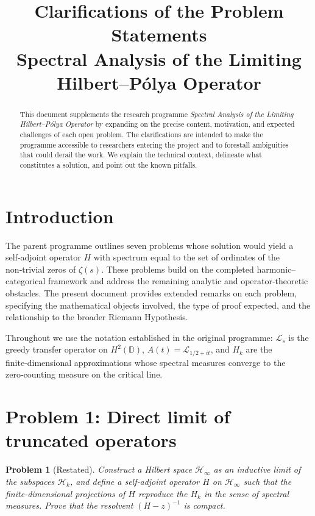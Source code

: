 \documentclass[11pt,a4paper]{article}
\title{\bfseries Clarifications of the Problem Statements\\
\large Spectral Analysis of the Limiting Hilbert--Pólya Operator}
\author{}
\date{}
\newtheorem{problem}{Problem}[section]
\theoremstyle{remark}
\newcommand{\cL}{\mathcal{L}}
\newcommand{\cH}{\mathcal{H}}
\begin{document}
\maketitle

\begin{abstract}
This document supplements the research programme \emph{Spectral Analysis of the Limiting Hilbert--Pólya Operator} by expanding on the precise content, motivation, and expected challenges of each open problem. The clarifications are intended to make the programme accessible to researchers entering the project and to forestall ambiguities that could derail the work. We explain the technical context, delineate what constitutes a solution, and point out the known pitfalls.
\end{abstract}

\section{Introduction}
The parent programme \cite{programme-H} outlines seven problems whose solution would yield a self‑adjoint operator $H$ with spectrum equal to the set of ordinates of the non‑trivial zeros of $\zeta(s)$. These problems build on the completed harmonic--categorical framework \cite{findings} and address the remaining analytic and operator‑theoretic obstacles. The present document provides extended remarks on each problem, specifying the mathematical objects involved, the type of proof expected, and the relationship to the broader Riemann Hypothesis.

Throughout we use the notation established in the original programme: $\cL_s$ is the greedy transfer operator on $H^2(\mathbb{D})$, $A(t)=\cL_{1/2+it}$, and $H_k$ are the finite‑dimensional approximations whose spectral measures converge to the zero‑counting measure on the critical line.

\section{Problem 1: Direct limit of truncated operators}

\begin{problem}[Restated]
Construct a Hilbert space $\cH_\infty$ as an inductive limit of the subspaces $\cH_k$, and define a self‑adjoint operator $H$ on $\cH_\infty$ such that the finite‑dimensional projections of $H$ reproduce the $H_k$ in the sense of spectral measures. Prove that the resolvent $(H-z)^{-1}$ is compact.
\end{problem}
\end{document}

